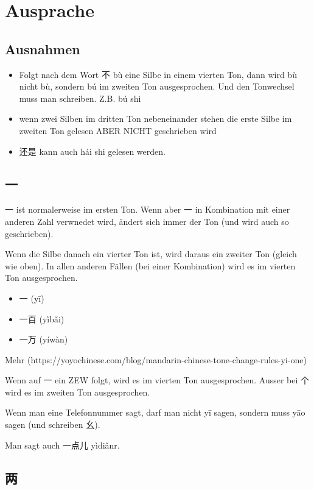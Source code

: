 \documentclass[UTF8]{ctexart}
\begin{document}
\section{Ausprache}

\subsection{Ausnahmen}

\begin{itemize}
    \item Folgt nach dem Wort 不 bù eine Silbe in einem vierten Ton, dann wird bù nicht bù,
    sondern bú im zweiten Ton ausgesprochen. Und den Tonwechsel muss man
    schreiben. Z.B. bú shì
    \item wenn zwei Silben im dritten Ton nebeneinander stehen die erste Silbe im zweiten
    Ton gelesen ABER NICHT geschrieben wird
    \item 还是 kann auch hái shi gelesen werden.
\end{itemize}

\subsection{一}

一 ist normalerweise im ersten Ton. Wenn aber 一 in Kombination mit einer anderen Zahl verwnedet wird, ändert sich immer der Ton (und wird auch so geschrieben). 

Wenn die Silbe danach ein vierter Ton ist, wird daraus ein zweiter Ton (gleich wie oben). In allen anderen Fällen (bei einer Kombination) wird es im vierten Ton ausgesprochen.

\begin{itemize}
    \item 一 (yī)
    \item 一百 (yìbǎi)
    \item 一万 (yíwàn)
\end{itemize}

Mehr (https://yoyochinese.com/blog/mandarin-chinese-tone-change-rules-yi-one)

Wenn auf 一 ein ZEW folgt, wird es im vierten Ton ausgesprochen. Ausser bei 个 wird es im zweiten Ton ausgesprochen.

Wenn man eine Telefonnummer sagt, darf man nicht yī sagen, sondern muss yāo sagen (und schreiben 幺).

Man sagt auch 一点儿 yìdiǎnr.

\subsection{两}
\end{document}
